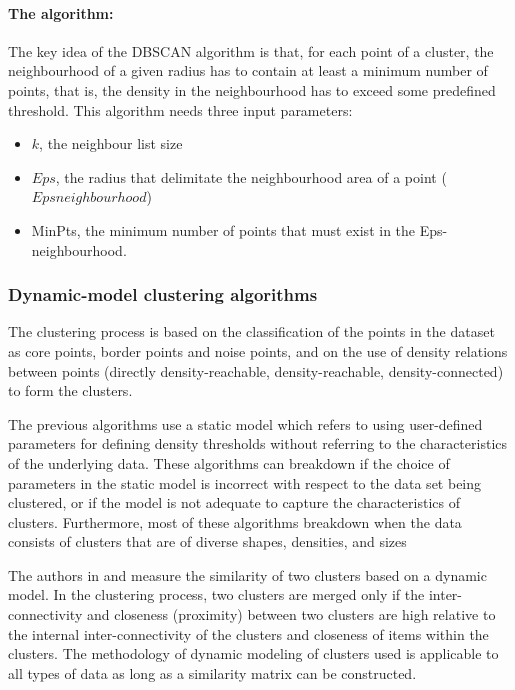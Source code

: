 \paragraph{The algorithm:}

\citep{literature_2}  The key idea of the DBSCAN algorithm is that, for each point of a cluster, the neighbourhood 
of a given radius has to contain at least a minimum number of points, that is, the density in 
the neighbourhood has to exceed some predefined threshold. This algorithm needs three 
input parameters:
\begin{itemize}  
\item{$k$, the neighbour list size} 
\item{$Eps$, the radius that delimitate the neighbourhood area of a point ($Epsneighbourhood$)}
\item{MinPts, the minimum number of points that must exist in the Eps-neighbourhood.}
\end{itemize} 

\subsubsection{Dynamic-model clustering algorithms}
The clustering process is based on the classification of the points in the dataset as  core 
points,  border points and  noise points, and on the use of density relations between points 
(directly density-reachable,  density-reachable,  density-connected) to form the 
clusters. 

The previous algorithms use a static model which refers to using user-defined parameters for defining density thresholds without referring to the characteristics of the underlying data. These algorithms can breakdown if the choice of parameters in the static model is incorrect with respect to the data set being clustered, or if the model is not adequate to capture the characteristics of clusters. Furthermore, most of these
algorithms breakdown when the data consists of clusters that are of diverse shapes, densities, and sizes

The authors in \citep{clustering_14} and \cite{Mitosis_1} measure the similarity of two clusters based on
a dynamic model. In the clustering process, two clusters are merged only if the inter-connectivity and closeness
(proximity) between two clusters are high relative to the internal inter-connectivity of the clusters and closeness of
items within the clusters. The methodology of dynamic modeling of clusters used is applicable to all types of data as long as a similarity matrix can be constructed.

